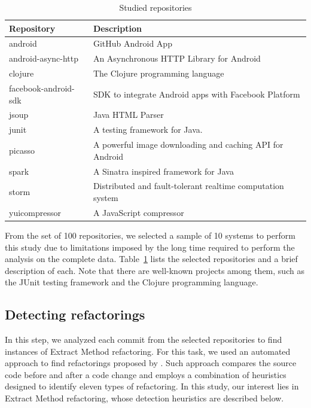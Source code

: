 \begin{table}[bp]\centering
\renewcommand{\arraystretch}{1.3}
\caption{Studied repositories}
\begin{tabular}{@{}ll@{}}\toprule
Repository & Description \\
\midrule
android & GitHub Android App \\
android-async-http & An Asynchronous HTTP Library for Android \\
clojure & The Clojure programming language \\
facebook-android-sdk & SDK to integrate Android apps with Facebook Platform \\
jsoup & Java HTML Parser \\ %
junit & A testing framework for Java. \\
picasso & A powerful image downloading and caching API for Android \\
spark & A Sinatra inspired framework for Java \\
storm & Distributed and fault-tolerant realtime computation system \\
yuicompressor & A JavaScript compressor \\
\bottomrule
\end{tabular}
\label{ch5:tsystems}
\end{table}

From the set of 100 repositories, we selected a sample of 10 systems to perform this study due to limitations imposed by the long time required to perform the analysis on the complete data. Table~\ref{ch5:tsystems} lists the selected repositories and a brief description of each. Note that there are well-known projects among them, such as the JUnit testing framework and the Clojure programming language.

\subsection{Detecting refactorings}
\label{srefactoringdetection}

In this step, we analyzed each commit from the selected repositories to find instances of Extract Method refactoring. For this task, we used an automated approach to find refactorings proposed by \cite{tsantalis_empiricalstudy}. Such approach compares the source code before and after a code change and employs a combination of heuristics designed to identify eleven types of refactoring.
In this study, our interest lies in Extract Method refactoring, whose detection heuristics are described below.

